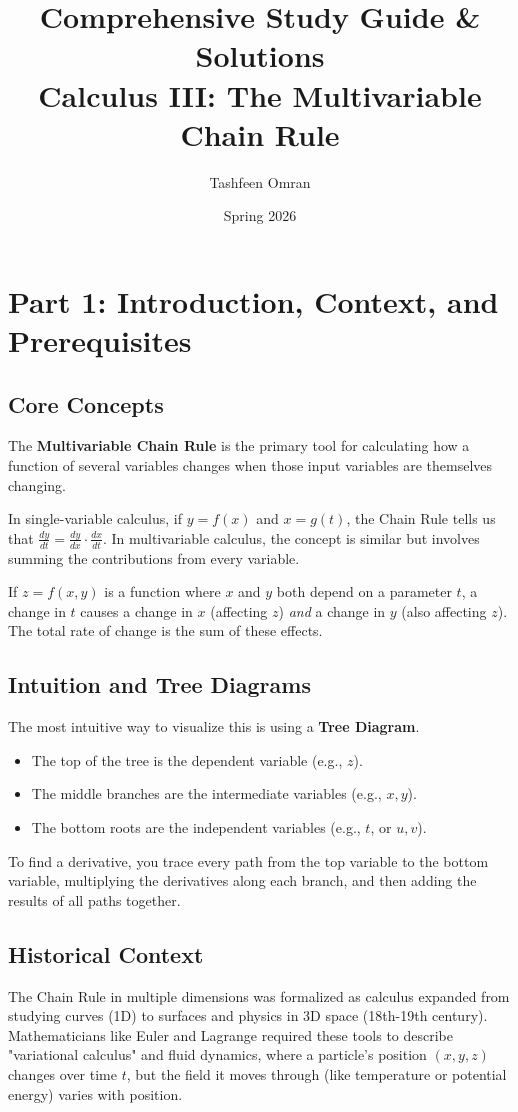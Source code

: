 \documentclass[11pt, letterpaper]{article}
\title{\textbf{Comprehensive Study Guide \& Solutions}\\ Calculus III: The Multivariable Chain Rule}
\author{Tashfeen Omran}
\date{Spring 2026}
\theoremstyle{definition}
\begin{document}
\maketitle
\tableofcontents
\newpage

\section{Part 1: Introduction, Context, and Prerequisites}

\subsection{Core Concepts}
The \textbf{Multivariable Chain Rule} is the primary tool for calculating how a function of several variables changes when those input variables are themselves changing. 

In single-variable calculus, if $y = f(x)$ and $x = g(t)$, the Chain Rule tells us that $\frac{dy}{dt} = \frac{dy}{dx} \cdot \frac{dx}{dt}$. In multivariable calculus, the concept is similar but involves summing the contributions from every variable.

If $z = f(x, y)$ is a function where $x$ and $y$ both depend on a parameter $t$, a change in $t$ causes a change in $x$ (affecting $z$) \textit{and} a change in $y$ (also affecting $z$). The total rate of change is the sum of these effects.

\subsection{Intuition and Tree Diagrams}
The most intuitive way to visualize this is using a \textbf{Tree Diagram}.
\begin{itemize}
    \item The top of the tree is the dependent variable (e.g., $z$).
    \item The middle branches are the intermediate variables (e.g., $x, y$).
    \item The bottom roots are the independent variables (e.g., $t$, or $u, v$).
\end{itemize}
To find a derivative, you trace every path from the top variable to the bottom variable, multiplying the derivatives along each branch, and then adding the results of all paths together.

\subsection{Historical Context}
The Chain Rule in multiple dimensions was formalized as calculus expanded from studying curves (1D) to surfaces and physics in 3D space (18th-19th century). Mathematicians like Euler and Lagrange required these tools to describe "variational calculus" and fluid dynamics, where a particle's position $(x, y, z)$ changes over time $t$, but the field it moves through (like temperature or potential energy) varies with position.
\end{document}
